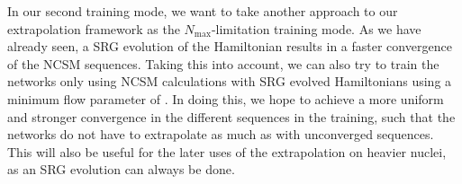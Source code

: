 In our second training mode, we want to take another approach to our extrapolation framework as the $N_\mathrm{max}$-limitation training mode. As we have already seen, a SRG evolution of the Hamiltonian results in a faster convergence of the NCSM sequences. Taking this into account, we can also try to train the networks only using NCSM calculations with SRG evolved Hamiltonians using a minimum flow parameter of . In doing this, we hope to achieve a more uniform and stronger convergence in the different sequences in the training, such that the networks do not have to extrapolate as much as with unconverged sequences. This will also be useful for the later uses of the extrapolation on heavier nuclei, as an SRG evolution can always be done.
